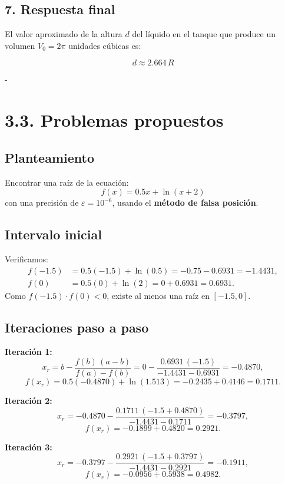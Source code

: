 \documentclass[12pt]{article}
\begin{document}
\begin{center}
\subsection*{7. Respuesta final}

El valor aproximado de la altura \(d\) del líquido en el tanque que produce un volumen \(V_0 = 2\pi\) unidades cúbicas es:

\[
\boxed{d \approx 2.664\,R}
\]



-
\section*{3.3. Problemas propuestos}

\subsection*{Planteamiento}

Encontrar una raíz de la ecuación:
\[
f(x) = 0.5x + \ln(x+2)
\]
con una precisión de \(\varepsilon = 10^{-6}\), usando el \textbf{método de falsa posición}.

\subsection*{Intervalo inicial}

Verificamos:
\[
\begin{aligned}
f(-1.5) &= 0.5(-1.5) + \ln(0.5) = -0.75 - 0.6931 = -1.4431,\\
f(0)    &= 0.5(0)    + \ln(2)   = 0 + 0.6931 = 0.6931.
\end{aligned}
\]
Como \(f(-1.5)\cdot f(0)<0\), existe al menos una raíz en \([-1.5,0]\).

\subsection*{Iteraciones paso a paso}

\textbf{Iteración 1:}
\[
x_r = b - \frac{f(b)\,(a - b)}{f(a)-f(b)}
= 0 - \frac{0.6931\,(-1.5)}{-1.4431 - 0.6931}
= -0.4870,
\]
\[
f(x_r) = 0.5(-0.4870) + \ln(1.513)
= -0.2435 + 0.4146 = 0.1711.
\]

\textbf{Iteración 2:}
\[
x_r = -0.4870 - \frac{0.1711\,(-1.5 + 0.4870)}{-1.4431 - 0.1711}
= -0.3797,
\]
\[
f(x_r) = -0.1899 + 0.4820 = 0.2921.
\]

\textbf{Iteración 3:}
\[
x_r = -0.3797 - \frac{0.2921\,(-1.5 + 0.3797)}{-1.4431 - 0.2921}
= -0.1911,
\]
\[
f(x_r) = -0.0956 + 0.5938 = 0.4982.
\]


\end{center}
\end{document}
